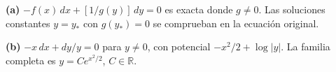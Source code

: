 \noindent\textbf{(a)} $-f(x)\,dx+[1/g(y)]\,dy=0$ es exacta donde $g\ne0$. Las soluciones constantes $y=y_*$ con $g(y_*)=0$ se comprueban en la ecuación original.

\noindent\textbf{(b)} $-x\,dx+dy/y=0$ para $y\ne0$, con potencial $-x^2/2+\log|y|$. La familia completa es $y=Ce^{x^2/2}$, $C\in\mathbb R$.
